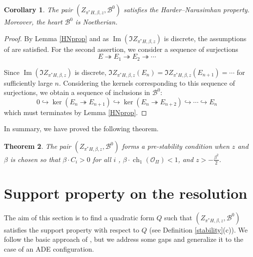 \documentclass[12pt]{amsart}
\newtheorem{theorem}{Theorem}[section]
\newtheorem{corollary}[theorem]{Corollary}
\theoremstyle{definition}
\DeclareMathOperator{\Img}{Im}
\DeclareMathOperator{\ch}{ch}
\begin{document}
\begin{corollary}\label{Noeth}
The pair $(Z_{\pi^\ast H,\beta,z},\mathcal{B}^0)$ satisfies the Harder--Narasimhan property.
Moreover, the heart $\mathcal{B}^0$ is Noetherian.
\end{corollary}
\begin{proof}
By Lemma \ref{HNprop} and as $\Img (\Im Z_{\pi^\ast H,\beta,z})$ is discrete, 
the assumptions of \cite[Proposition B.2]{BM11} are satisfied.
For the second assertion,
we consider a sequence of surjections 
\[
E \twoheadrightarrow E_1 \twoheadrightarrow E_2 \twoheadrightarrow \cdots
\]

Since $\Img (\Im Z_{\pi^\ast H,\beta,z})$ is discrete, $\Im Z_{\pi^\ast H,\beta,z}(E_n)=\Im Z_{\pi^\ast H,\beta,z}(E_{n+1})= \cdots$ for sufficiently large $n$.
Considering the kernels corresponding to this sequence of surjections, 
we obtain a sequence of inclusions in $\mathcal{B}^0$:
\[ 0 \hookrightarrow \ker(E_n\twoheadrightarrow E_{n+1}) \hookrightarrow \ker(E_n\twoheadrightarrow E_{n+2}) \hookrightarrow \cdots \hookrightarrow E_n\]
which must terminates by Lemma \ref{HNprop}.
\end{proof}

In summary, we have proved the following theorem.

\begin{theorem}\label{prestab}
The pair $(Z_{\pi^\ast H,\beta,z},\mathcal{B}^0)$ forms a pre-stability condition when $z$ and $\beta$ is chosen so that $\beta \cdot C_i>0$ for all $i$ , $\beta \cdot \ch_1(\mathcal{O}_{\Pi}) <1$, and $z> -\frac{\beta^2}{2}$.
\end{theorem}



\section{Support property on the resolution}
The aim of this section is to find a quadratic form $Q$ such that $(Z_{\pi^\ast H,\beta, z},\mathcal{B}^0)$ satisfies the support property with respect to $Q$ (see Definition \ref{stability}(c)).
We follow the basic approach of \cite[Sect. 6]{TX22},
but we address some gaps and generalize it to the case of an ADE configuration.
\end{document}

